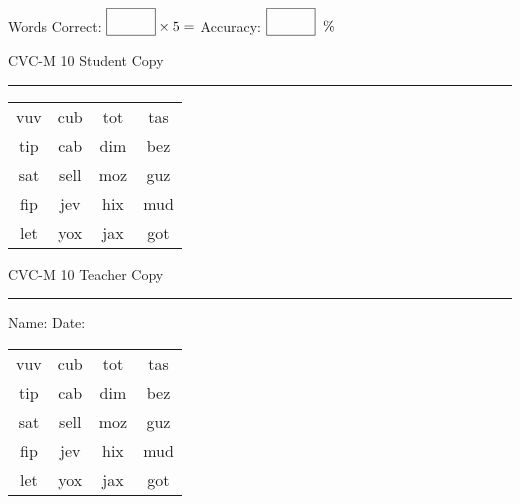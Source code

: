 \documentclass{memoir}
\begin{document}
\small

Words Correct: $\fbox{\phantom{\huge 100}} \times 5 = $ Accuracy: $\fbox{\phantom{\huge 100}}\;\; \%$ 

\vfill

\newpage


\footnotesize \noindent
CVC-M 10 \hfill Student Copy
\smallskip
\hrule

\Large

\setlength{\tabcolsep}{14pt}
\def\arraystretch{2}

{\selectfont


\begin{vplace}[0.5]
\begin{center}
\begin{tabular}{cccc}
vuv & cub & tot & tas \\
tip & cab & dim & bez \\
sat & sell & moz & guz \\
fip & jev & hix & mud \\
let & yox & jax & got \\
\end{tabular}
\end{center}
\end{vplace}

}

\newpage

\footnotesize \noindent
CVC-M 10 \hfill Teacher Copy
\smallskip
\hrule

\small

\vfill

\noindent
Name: \underline{\hspace{1.75in}} \hfill Date: \underline{\hspace{1in}}

\Large

{\selectfont


\begin{vplace}[0.5]
\begin{center}
\begin{tabular}{cccc}
vuv & cub & tot & tas \\
tip & cab & dim & bez \\
sat & sell & moz & guz \\
fip & jev & hix & mud \\
let & yox & jax & got \\
\end{tabular}
\end{center}
\end{vplace}



}
\end{document}
